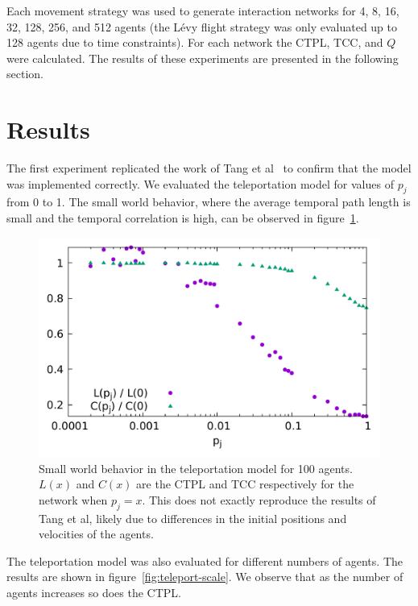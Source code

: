 \documentclass[conference]{IEEEtran}
\begin{document}
Each movement strategy was used to generate interaction networks for
4, 8, 16, 32, 128, 256, and 512 agents (the L\'evy flight strategy was
only evaluated up to 128 agents due to time constraints). For each
network the CTPL, TCC, and $Q$ were calculated. The results of these
experiments are presented in the following section.

\section{Results}
\label{sec:results}

The first experiment replicated the work of Tang et al~\cite{Tang2010}
to confirm that the model was implemented correctly. We evaluated the
teleportation model for values of $p_j$ from 0 to 1. The small world
behavior, where the average temporal path length is small and the
temporal correlation is high, can be observed in figure~\ref{fig:swb}.
\begin{figure}
  \includegraphics[width=\columnwidth]{teleport-swb.pdf}
  \caption{Small world behavior in the teleportation model for 100
    agents. $L(x)$ and $C(x)$ are the CTPL and TCC respectively for
    the network when $p_j = x$. This does not exactly reproduce the
    results of Tang et al, likely due to differences in the initial
    positions and velocities of the agents.}
  \label{fig:swb}
\end{figure}
The teleportation model was also evaluated for different numbers of
agents. The results are shown in figure~\ref{fig:teleport-scale}. We
observe that as the number of agents increases so does the CTPL.
\end{document}
